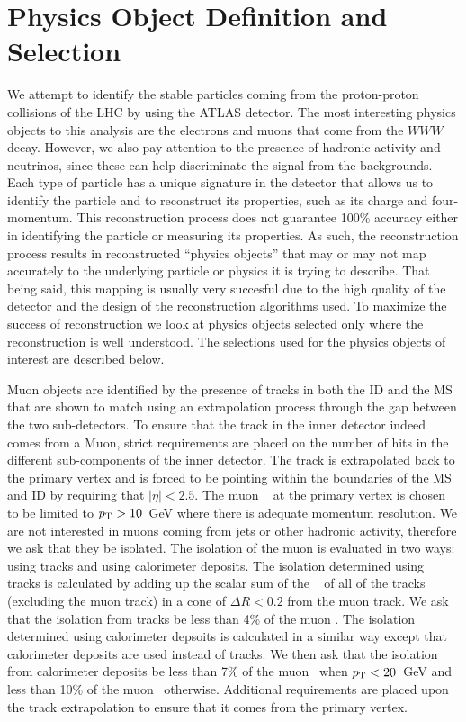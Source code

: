\section{Physics Object Definition and Selection}
\label{sec:object_selection}
We attempt to identify the stable particles coming from
the proton-proton collisions of the LHC by using the ATLAS detector.
The most interesting physics objects
to this analysis are the electrons and muons
that come from the $WWW$ decay. However, we also pay attention to 
the presence of hadronic activity and neutrinos, since these can
help discriminate the signal from the backgrounds.
Each type of particle has a unique signature in the detector
that allows us to identify the particle and to reconstruct 
its properties, such as its charge and four-momentum. 
This reconstruction process does not guarantee
100\% accuracy either in identifying the particle or measuring its 
properties. As such, the reconstruction process results in reconstructed
``physics objects'' that may or may not map accurately 
to the underlying particle or physics it is trying to describe. That 
being said, this mapping is usually very succesful due to the high quality
of the detector and the design of the reconstruction algorithms used.
To maximize the success of reconstruction we look at physics
objects selected only where the reconstruction is well understood.
The selections used for the physics objects of interest are described below.


Muon objects are identified by the presence of tracks in both 
the ID and the MS that are shown 
to match using an extrapolation process through the gap between the
two sub-detectors. To ensure that the track in the inner detector
indeed comes from a Muon, strict requirements are placed
on the number of hits in the different sub-components of the inner detector.
The track is extrapolated back to the primary vertex and is forced
to be pointing within the boundaries of the MS and ID
by requiring that $|\eta|<2.5$.
The muon \pt~ at the primary vertex is chosen to be limited to $p_{\mathrm{T}} > 10$~GeV
where there is adequate momentum resolution. We are not interested in 
muons coming from jets or other hadronic activity, therefore we
ask that they be isolated. The isolation of the muon is evaluated
in two ways: using tracks and using calorimeter deposits.
The isolation determined using tracks is calculated by adding
up the scalar sum of the \pt~ of all of the tracks (excluding
the muon track) in a cone of $\Delta R< 0.2$ from the muon track.
We ask that the isolation from tracks be less than 4\% of the muon \pt.
The isolation determined using calorimeter depsoits is calculated in
a similar way except that calorimeter deposits are used instead of tracks.
We then ask that the isolation from calorimeter deposits 
be less than 7\% of the muon \pt~when $p_{\mathrm{T}} < 20$~GeV and 
less than 10\% of the muon \pt~otherwise. Additional requirements
are placed upon the track extrapolation to ensure that it comes from
the primary vertex.



